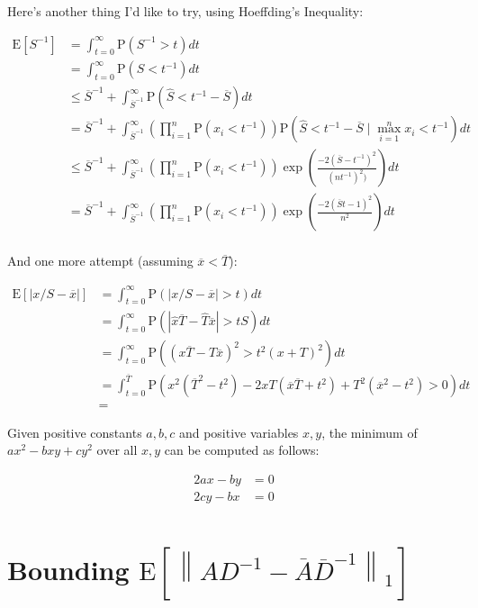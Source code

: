 \documentclass{article}
\newcommand \E[1] {\mathrm E \left[#1\right]} %
\newcommand \p[1] {\mathrm P \left(#1\right)}
\newcommand \inv [1] {{#1}^{-1}} %
\begin{document}
Here's another thing I'd like to try, using Hoeffding's Inequality:

\begin{align*}
\E{S^{-1}} &= \int_{t=0}^\infty \p{\inv S > t} dt \\
&= \int_{t=0}^\infty \p{S<\inv t} dt \\
&\leq \inv{\overline S} + \int_{\inv{\overline S}}^\infty \p{\hat S<\inv t - \overline S} dt \\
&= \inv{\overline S} + \int_{\inv{\overline S}}^\infty \left(\prod_{i=1}^n \p{x_i<\inv t}\right) \p{\hat S<\inv t-\overline S \mid \max_{i=1}^n x_i < \inv t} dt \\
&\leq \inv{\overline S} + \int_{\inv{\overline S}}^\infty \left(\prod_{i=1}^n \p{x_i<\inv t}\right) \exp\left(\frac{-2(\overline S-\inv t)^2}{(n\inv t)^2)}\right) dt \\
&= \inv{\overline S} + \int_{\inv{\overline S}}^\infty \left(\prod_{i=1}^n \p{x_i<\inv t}\right) \exp\left(\frac{-2(\overline S t - 1)^2}{n^2}\right) dt \\
\end{align*}

And one more attempt (assuming $\overline x < \overline T$):

\begin{align*}
\E{|x/S - \overline x|} &= \int_{t=0}^\infty \p{|x/S-\overline x|>t}dt \\
&= \int_{t=0}^\infty \p{|\hat x\overline T - \hat T\overline x|>tS} dt \\
&= \int_{t=0}^\infty \p{(x\overline T-T\overline x)^2>t^2(x+T)^2} dt \\
&= \int_{t=0}^{\overline T} \p{x^2(\overline T^2-t^2) - 2xT(\overline x\overline T + t^2) + T^2(\overline x^2 - t^2) > 0} dt \\
&= 
\end{align*}

Given positive constants $a,b,c$ and positive variables $x,y$, the minimum of $ax^2-bxy+cy^2$ over all $x,y$ can be computed as follows:

\begin{align*}
2ax-by &= 0 \\
2cy-bx &= 0 \\
\end{align*}

\section{Bounding $\E{\left\|A\inv D - \overline A\inv{\overline D}\right\|_1}$}
\end{document}
